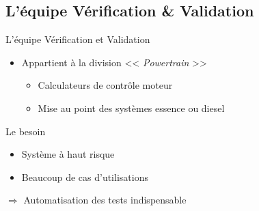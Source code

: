 \documentclass{beamer}
\begin{document}
\subsection{L'\'equipe V\'erification \& Validation}
\begin{frame}{L'\'equipe V\'erification et Validation}

	\begin{itemize}[<+->]

		\item Appartient à la division << \textit{Powertrain} >>
			\begin{itemize}
				\item Calculateurs de contrôle moteur
				\item Mise au point des systèmes essence ou diesel
			\end{itemize}
	\end{itemize}
	
	\vfill
	 {
	\begin{block}{Le besoin}
		\begin{itemize}[<+->]
			\item Système à haut risque 
			\item Beaucoup de cas d'utilisations 
		\end{itemize}
	\end{block}
	}
	 {
	\hspace{30px} $\Rightarrow$ Automatisation des tests indispensable
	}
\end{frame}
\end{document}

